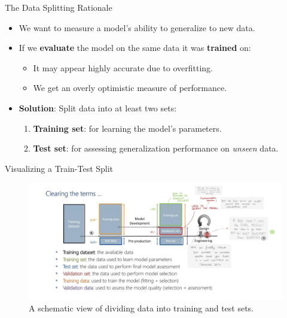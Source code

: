 
\begin{frame}{The Data Splitting Rationale}
\begin{itemize}
    \item We want to measure a model's ability to generalize to new data.
    \item If we \textbf{evaluate} the model on the same data it was \textbf{trained} on:
    \begin{itemize}
       \item It may appear highly accurate due to overfitting.
       \item We get an overly optimistic measure of performance.
    \end{itemize}
    \item \textbf{Solution}: Split data into at least two sets:
    \begin{enumerate}
       \item \textbf{Training set}: for learning the model's parameters.
       \item \textbf{Test set}: for assessing generalization performance on \emph{unseen} data.
    \end{enumerate}
\end{itemize}
\end{frame}

\begin{frame}{Visualizing a Train-Test Split}
\begin{figure}
    \includegraphics[width=\textwidth]{Images/train_test_split.png}
    \caption{A schematic view of dividing data into training and test sets.}
\end{figure}
\end{frame}

